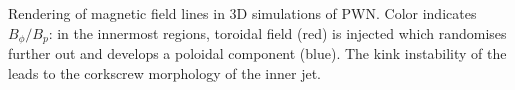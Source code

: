 Rendering of magnetic field lines in 3D simulations of PWN.  Color indicates $B_\phi/B_{p}$: in the innermost regions, toroidal field (red) is injected which randomises further out and develops a poloidal component (blue).  The kink instability of the leads to the corkscrew morphology of the inner jet.  